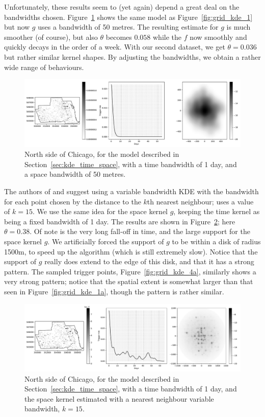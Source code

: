 \documentclass[twoside,a4paper]{article}
\theoremstyle{plain}
\theoremstyle{definition}
\begin{document}
Unfortunately, these results seem to (yet again) depend a great deal on the bandwidths chosen.
Figure~\ref{fig:grid_kde_3} shows the same model as Figure~\ref{fig:grid_kde_1} but now $g$ uses
a bandwidth of 50 metres.  The resulting estimate for $g$ is much smoother (of course), but also
$\theta$ becomes $0.058$ while the $f$ now smoothly and quickly decays in the order of a week.
With our second dataset, we get $\theta=0.036$ but rather similar kernel shapes.  By adjusting
the bandwidths, we obtain a rather wide range of behaviours.

\begin{figure}
  \includegraphics[width=\textwidth]{../notebooks/grid_kde_three.pdf}
  \caption{North side of Chicago, for the model described in Section~\ref{sec:kde_time_space},
  with a time bandwidth of 1 day, and a space bandwidth of 50 metres.}
  \label{fig:grid_kde_3}
\end{figure}

The authors of \cite{sepp} and \cite{zovj} suggest using a variable bandwidth KDE with the
bandwidth for each point chosen by the distance to the $k$th nearest neighbour; \cite{sepp}
uses a value of $k=15$.  We use the same idea for the space kernel $g$, keeping the time
kernel as being a fixed bandwidth of 1 day.  The results are shown in Figure~\ref{fig:grid_kde_4};
here $\theta = 0.38$.  Of note is the very long fall-off in time, and the large support for the 
space kernel $g$.  We artificially forced the support of $g$ to be within a disk of radius 1500m,
to speed up the algorithm (which is still extremely slow).  Notice that the support of $g$
really does extend to the edge of this disk, and that it has a strong pattern.  The sampled
trigger points, Figure~\ref{fig:grid_kde_4a}, similarly shows a very strong pattern; notice
that the spatial extent is somewhat larger than that seen in Figure~\ref{fig:grid_kde_1a},
though the pattern is rather similar.

\begin{figure}
  \includegraphics[width=\textwidth]{../notebooks/grid_kde_knn1.pdf}
  \caption{North side of Chicago, for the model described in Section~\ref{sec:kde_time_space},
  with a time bandwidth of 1 day, and the space kernel estimated with a nearest neighbour variable
  bandwidth, $k=15$.}
  \label{fig:grid_kde_4}
\end{figure}
\end{document}

